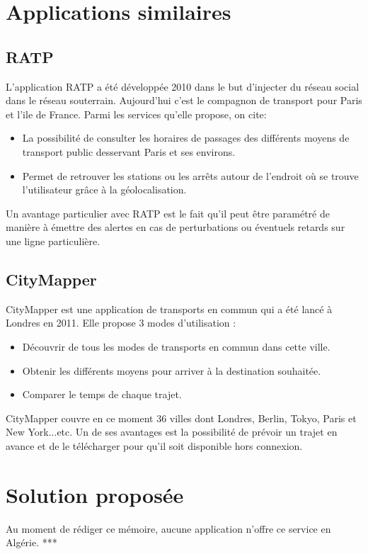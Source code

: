 \section{Applications similaires}			
\subsection{RATP}
L'application RATP a été développée 2010 dans le but d'injecter du réseau social dans le réseau souterrain. Aujourd'hui c'est le compagnon de transport pour Paris et l'ile de France.
Parmi les services qu'elle propose, on cite:
\begin{itemize}
	\item La possibilité de consulter les horaires de passages des différents moyens de transport public desservant Paris et ses environs. 
	\item Permet de retrouver les stations ou les arrêts autour de l'endroit où se trouve l'utilisateur grâce à la géolocalisation.
\end{itemize}
Un avantage particulier avec RATP est le fait qu'il peut être paramétré de manière à émettre des alertes en cas de perturbations ou éventuels retards sur une ligne particulière.
	
\subsection{CityMapper}
CityMapper est une application de transports en commun qui a été lancé à Londres en 2011.
Elle propose 3 modes d'utilisation : 
\begin{itemize}
	\item Découvrir de tous les modes de transports en commun dans cette ville.
	\item Obtenir les différents moyens pour arriver à la destination souhaitée.
	\item Comparer le temps de chaque trajet.
\end{itemize}

CityMapper couvre en ce moment 36 villes dont Londres, Berlin, Tokyo, Paris et New York...etc.  Un de ses avantages est la possibilité de prévoir un trajet en avance et de le télécharger pour qu'il soit disponible hors connexion.

\section{Solution proposée}
Au moment de rédiger ce mémoire, aucune application n'offre ce service en Algérie. ***

